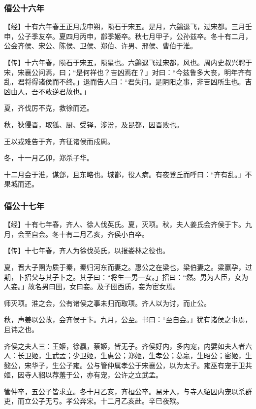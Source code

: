 \documentclass[]{article}
\begin{document}
\hypertarget{header-n818}{%
\subsubsection{僖公十六年}\label{header-n818}}

【经】十有六年春王正月戊申朔，陨石于宋五。是月，六鷁退飞，过宋都。三月壬申，公子季友卒。夏四月丙申，鄫季姬卒。秋七月甲子，公孙兹卒。冬十有二月，公会齐侯、宋公、陈侯、卫侯、郑伯、许男、邢侯、曹伯于淮。

【传】十六年春，陨石于宋五，陨星也。六鷁退飞过宋都，风也。周内史叔兴聘于宋，宋襄公问焉，曰；``是何祥也？吉凶焉在？」对曰：``今兹鲁多大丧，明年齐有乱，君将得诸侯而不终。」退而告人曰：``君失问。是阴阳之事，非吉凶所生也。吉凶由人，吾不敢逆君故也。」

夏，齐伐厉不克，救徐而还。

秋，狄侵晋，取狐、厨、受铎，涉汾，及昆都，因晋败也。

王以戎难告于齐，齐征诸侯而戍周。

冬，十一月乙卯，郑杀子华。

十二月会于淮，谋郐，且东略也。城鄫，役人病。有夜登丘而呼曰：``齐有乱。」不果城而还。

\hypertarget{header-n828}{%
\subsubsection{僖公十七年}\label{header-n828}}

【经】十有七年春，齐人、徐人伐英氏。夏，灭项。秋，夫人姜氏会齐侯于卞。九月，会至自会。冬十有二月乙亥，齐侯小白卒。

【传】十七年春，齐人为徐伐英氏，以报娄林之役也。

夏，晋大子圉为质于秦，秦归河东而妻之。惠公之在梁也，梁伯妻之。梁赢孕，过期，卜招父与其子卜之。其子曰：``将生一男一女。」招曰：``然。男为人臣，女为人妾。」故名男曰圉，女曰妾。及子圉西质，妾为宦女焉。

师灭项。淮之会，公有诸侯之事未归而取项。齐人以为讨，而止公。

秋，声姜以公故，会齐侯于卞。九月，公至。书曰：``至自会。」犹有诸侯之事焉，且讳之也。

齐侯之夫人三：王姬，徐嬴，蔡姬，皆无子。齐侯好内，多内宠，内嬖如夫人者六人：长卫姬，生武孟；少卫姬，生惠公；郑姬，生孝公；葛嬴，生昭公；密姬，生懿公，宋华子，生公子雍。公与管仲属孝公于宋襄公，以为太子。雍巫有宠于卫共姬，因寺人貂以荐羞于公，亦有宠，公许之立武孟。

管仲卒，五公子皆求立。冬十月乙亥，齐桓公卒。易牙入，与寺人貂因内宠以杀群吏，而立公子无亏。孝公奔宋。十二月乙亥赴。辛巳夜殡。
\end{document}

